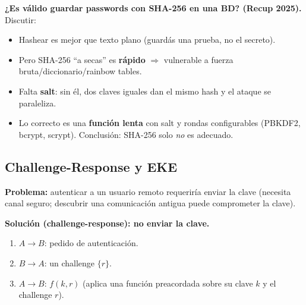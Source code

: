 \documentclass[../main.tex]{subfiles}
\begin{document}
\begin{examen}
\textbf{¿Es válido guardar passwords con SHA-256 en una BD? (Recup 2025).} Discutir:
\begin{itemize}[itemsep=1pt]
  \item Hashear es mejor que texto plano (guardás una prueba, no el secreto).
  \item Pero SHA-256 ``a secas'' es \textbf{rápido} $\Rightarrow$ vulnerable a fuerza bruta/diccionario/rainbow tables.
  \item Falta \textbf{salt}: sin él, dos claves iguales dan el mismo hash y el ataque se paraleliza.
  \item Lo correcto es una \textbf{función lenta} con salt y rondas configurables (PBKDF2, bcrypt, scrypt). Conclusión: SHA-256 solo \emph{no} es adecuado.
\end{itemize}
\end{examen}

\subsection{Challenge-Response y EKE}

\textbf{Problema:} autenticar a un usuario remoto requeriría enviar la clave (necesita canal seguro; descubrir una comunicación antigua puede comprometer la clave).

\textbf{Solución (challenge-response): no enviar la clave.}
\begin{enumerate}[itemsep=1pt]
  \item $A \to B$: pedido de autenticación.
  \item $B \to A$: un challenge $\{r\}$.
  \item $A \to B$: $f(k,r)$ (aplica una función preacordada sobre su clave $k$ y el challenge $r$).
\end{enumerate}
\end{document}
